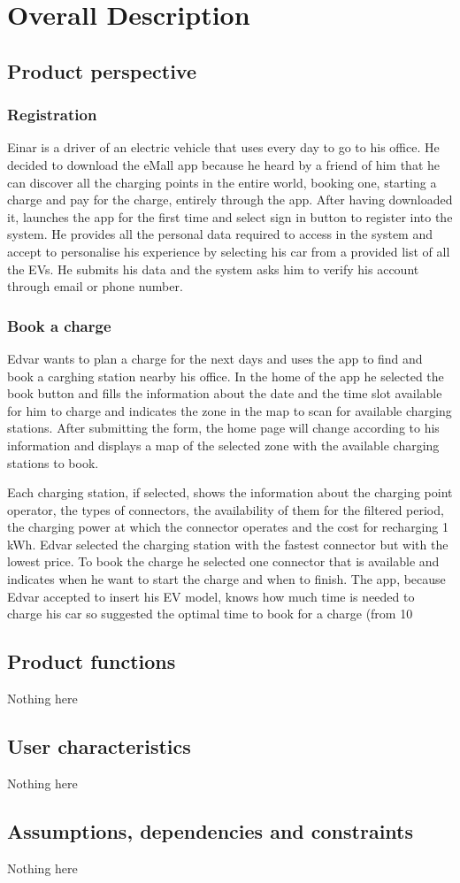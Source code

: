 \section{Overall Description}

\subsection{Product perspective}

\subsubsection{Registration}
Einar is a driver of an electric vehicle that uses every day to go to his office. He decided to download the eMall app because he heard by a friend of him that he can discover all the charging points in the entire world, booking one, starting a charge and pay for the charge, entirely through the app. After having downloaded it, launches the app for the first time and select sign in button to register into the system. He provides all the personal data required to access in the system and accept to personalise his experience by selecting his car from a provided list of all the EVs. He submits his data and the system asks him to verify his account through email or phone number.
\subsubsection{Book a charge}
Edvar wants to plan a charge for the next days and uses the app to find and book a carghing station nearby his office. In the home of the app he selected the book button and fills the information about the date and the time slot available for him to charge and indicates the zone in the map to scan for available charging stations. After submitting the form, the home page will change according to his information and displays a map of the selected zone with the available charging stations to book. 

Each charging station, if selected, shows the information about the charging point operator, the types of connectors, the availability of them for the filtered period, the charging power at which the connector operates and the cost for recharging 1 kWh. Edvar selected the charging station with the fastest connector but with the lowest price. To book the charge he selected one connector that is available and indicates when he want to start the charge and when to finish. The app, because Edvar accepted to insert his EV model, knows how much time is needed to charge his car so suggested the optimal time to book for a charge (from 10%

\subsection{Product functions}
Nothing here

\subsection{User characteristics}
Nothing here

\subsection{Assumptions, dependencies and constraints}
Nothing here
